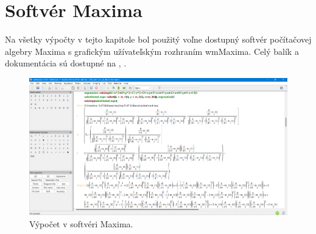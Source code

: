 \section{Softvér Maxima}
Na všetky výpočty v tejto kapitole bol použitý voľne dostupný softvér počítačovej algebry Maxima s grafickým užívateľským rozhraním wmMaxima. Celý balík a dokumentácia sú dostupné na \cite{MaximaDoc}, \cite{MaximaDownload}.
\begin{figure}[h]
	\centering
	\includegraphics[width=\textwidth]{images/maxima.png}
	\caption[Softvér Maxima.]{Výpočet v softvéri Maxima.}
	\label{fig:3D_point_lies}
\end{figure}

